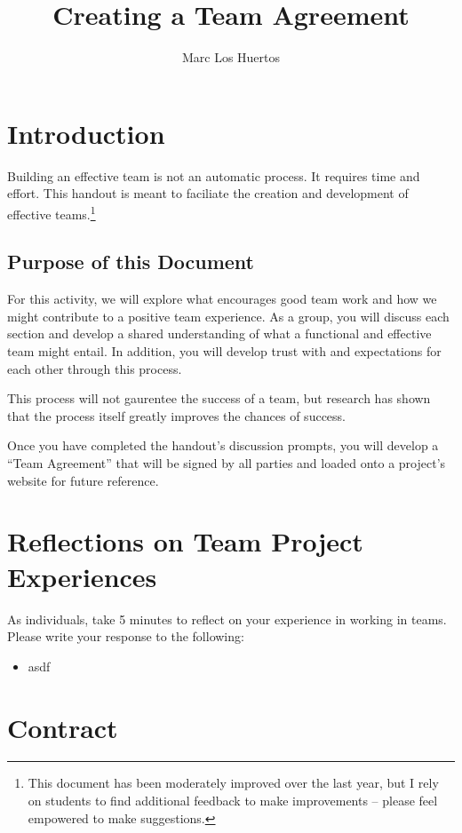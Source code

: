 \documentclass{article}\usepackage[]{graphicx}\usepackage[]{color}
\title{Creating a Team Agreement}
\author{Marc Los Huertos}
\begin{document}
\maketitle

\section{Introduction}

Building an effective team is not an automatic process. It requires time and effort. This handout is meant to faciliate the creation and development of effective teams.\footnote{This document has been moderately improved over the last year, but I rely on students to find additional feedback to make improvements -- please feel empowered to make suggestions.}

\subsection{Purpose of this Document}

For this activity, we will explore what encourages good team work and how we might contribute to a positive team experience. As a group, you will discuss each section and develop a shared understanding of what a functional and effective team might entail. In addition, you will develop trust with and expectations for each other through this process. 

This process will not gaurentee the success of a team, but research has shown that the process itself greatly improves the chances of success.


Once you have completed the handout's discussion prompts, you will develop a ``Team Agreement'' that will be signed by all parties and loaded onto a project's website for future reference.

\section{Reflections on Team Project Experiences}

As individuals, take 5 minutes to reflect on your experience in working in teams. Please write your response to the following:

\begin{itemize}

\item asdf

\end{itemize}

\section{Contract}
\end{document}
